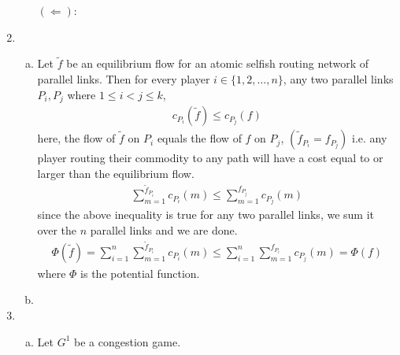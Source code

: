 \documentclass[a4paper,12pt]{article}
\theoremstyle{definition}
\begin{document}
\begin{enumerate}
\begin{enumerate}[(i)]
$(\Leftarrow)$:
\end{enumerate}

\item
\begin{enumerate}[(a)]
\item Let $\tilde{f}$ be an equilibrium flow for an atomic selfish routing network of parallel links. Then for every player $i \in \{1,2,\ldots, n\}$, any two parallel links $P_i,P_j$ where $1\leq i < j \leq k$,
\begin{align*}
c_{P_i}(\tilde{f})\leq c_{P_j}(f)
\end{align*}
here, the flow of $\tilde{f}$ on $P_i$ equals the flow of $f$ on $P_j$, $(\tilde{f}_{P_i}=f_{P_j})$ i.e. any player routing their commodity to any path will have a cost equal to or larger than the equilibrium flow.
\begin{align*}
\sum_{m=1}^{\tilde{f}_{P_i}}c_{P_i}(m)\leq \sum_{m=1}^{f_{P_j}}c_{P_j}(m)
\end{align*}
since the above inequality is true for any two parallel links, we sum it over the $n$ parallel links and we are done.
\begin{align*}
\Phi(\tilde{f})=\sum_{i=1}^{n}\sum_{m=1}^{\tilde{f}_{P_i}}c_{P_i}(m)\leq \sum_{i=1}^{n}\sum_{m=1}^{f_{P_i}}c_{P_j}(m)=\Phi(f)
\end{align*}
where $\Phi$ is the potential function.
\item
\end{enumerate}

\item
\begin{enumerate}[(a)]
\item Let $G^1$ be a congestion game.



\end{enumerate}



\end{enumerate}
\end{document}
